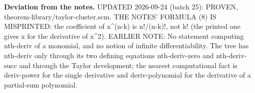 %
\noindent\textbf{Deviation from the notes.} UPDATED 2026-09-24 (batch 25): PROVEN, theorem-library/taylor-cluster.scm. THE NOTES' FORMULA (8) IS MISPRINTED: the coefficient of x\textasciicircum{}(n-k) is n!/(n-k)!, not k! (the printed one gives x for the derivative of x\textasciicircum{}2). EARLIER NOTE: No statement computing nth-deriv of a monomial, and no notion of infinite differentiability. The tree has nth-deriv only through its two defining equations nth-deriv-zero and nth-deriv-succ and through the Taylor development; the nearest computational fact is deriv-power for the single derivative and deriv-polynomial for the derivative of a partial-sum polynomial.
%
\renewcommand{\thethm}{2.4}
\begin{prop}\label{thm:diff-implies-continuous}
%
\leavevmode
{}
%
\end{prop}
%
